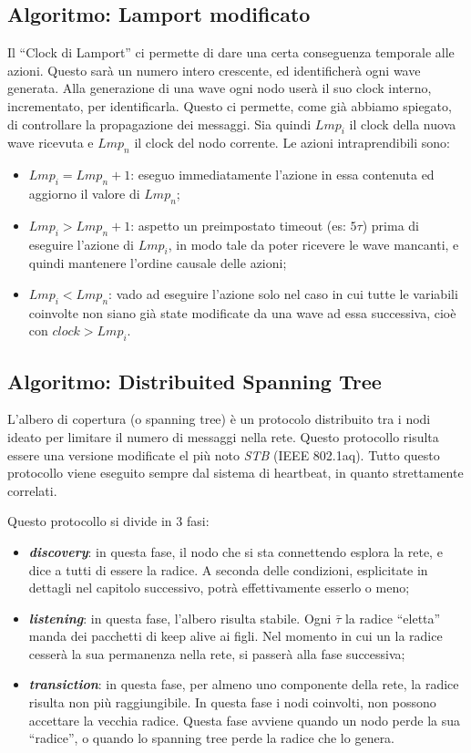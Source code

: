 \documentclass[italian]{memoir}
\begin{document}
\subsection{Algoritmo: Lamport modificato}
Il ``Clock di Lamport'' ci permette di dare una certa conseguenza temporale alle azioni.
	   Questo sarà un numero intero crescente, ed identificherà ogni wave generata. Alla
	   generazione di una wave ogni nodo userà il suo clock interno, incrementato, per
	   identificarla. Questo ci permette, come già abbiamo spiegato, di controllare la
	   propagazione dei messaggi. Sia quindi $Lmp_i$ il clock della nuova wave ricevuta
	   e $Lmp_n$ il clock del nodo corrente. Le azioni intraprendibili sono:
\begin{itemize}
	\item $Lmp_i = Lmp_n + 1$: eseguo immediatamente l'azione in essa contenuta ed aggiorno
	   il valore di $Lmp_n$;
	\item $Lmp_i > Lmp_n + 1$: aspetto un preimpostato timeout (es: $5\tau$) prima di
	   eseguire l'azione di $Lmp_i$, in modo tale da poter ricevere le wave mancanti, e
	   quindi mantenere l'ordine causale delle azioni;
	\item $Lmp_i < Lmp_n$: vado ad eseguire l'azione solo nel caso in cui tutte le variabili
	   coinvolte non siano già state modificate da una wave ad essa successiva, cioè con
	   $clock > Lmp_i$.
\end{itemize}

\subsection{Algoritmo: Distribuited Spanning Tree}\label{algo:dstp}
L'albero di copertura (o spanning tree) è un protocolo distribuito tra i nodi ideato per limitare il numero di messaggi nella rete. Questo protocollo risulta essere una versione modificate el più noto \textit{STB} (IEEE 802.1aq). Tutto questo protocollo viene eseguito sempre dal sistema di heartbeat, in quanto strettamente correlati.

Questo protocollo si divide in 3 fasi:
\begin{itemize}
    \item \textit{\textbf{discovery}}: in questa fase, il nodo che si sta connettendo esplora la rete, e dice a tutti di essere la radice. A seconda delle condizioni, esplicitate in dettagli nel capitolo successivo, potrà effettivamente esserlo o meno;
    \item \textit{\textbf{listening}}: in questa fase, l'albero risulta stabile. Ogni $\bar{\tau}$ la radice ``eletta'' manda dei pacchetti di keep alive ai figli. Nel momento in cui un la radice cesserà la sua permanenza nella rete, si passerà alla fase successiva;
    \item \textit{\textbf{transiction}}: in questa fase, per almeno uno componente della rete, la radice risulta non più raggiungibile. In questa fase i nodi coinvolti, non possono accettare la vecchia radice. Questa fase avviene quando un nodo perde la sua ``radice'', o quando lo spanning tree perde la radice che lo genera.
\end{itemize}
\end{document}
